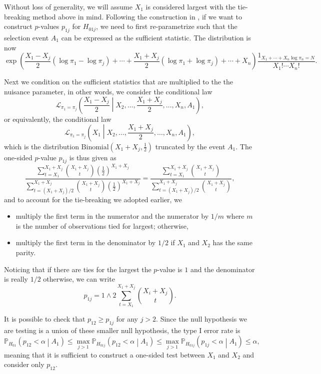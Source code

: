 \documentclass[11pt]{article}
\newcommand{\PP}{\mathbb{P}}
\begin{document}
Without loss of generality, we will assume $X_1$ is considered largest with the tie-breaking method above in mind. Following the construction in \cite{Fithian:2014ws}, if we want to construct $p$-values $p_{1j}$ for $H_{01j}$, we need to first re-parametrize such that the selection event $A_1$ can be expressed as the sufficient statistic. The distribution is now
$$\exp\left(\frac{X_1 - X_j}{2} \left(\log \pi_1 - \log \pi_j\right) + \cdots + \frac{X_1 + X_j}{2} \left(\log \pi_1 + \log \pi_j\right) + \cdots + X_n\right) \frac{1_{X_1 + \cdots + X_n \log \pi_n = N}}{X_1! \cdots X_n!}.$$

Next we condition on the sufficient statistics that are multiplied to the the nuisance parameter, in other words, we consider the conditional law
$$\mathcal{L}_{\pi_1 = \pi_j}\left(\frac{X_1 - X_j}{2} \middle| X_2, \ldots, \frac{X_1 + X_j}{2}, \ldots, X_n, A_1\right),$$
or equivalently, the conditional law
$$\mathcal{L}_{\pi_1 = \pi_j}\left(X_1 \middle| X_2, \ldots, \frac{X_1 + X_j}{2}, \ldots, X_n, A_1\right),$$
which is the distribution $\text{Binomial}\left(X_1 + X_j, \frac{1}{2}\right)$ truncated by the event $A_1$. The one-sided $p$-value $p_{1j}$ is thus given as
$$\frac{\sum_{t = X_1}^{X_1 + X_j} \binom{X_1 + X_j}{t} \left(\frac{1}{2}\right)^{X_1 + X_j}}{\sum_{t = \left(X_1 + X_j\right)/2}^{X_1 + X_j} \binom{X_1 + X_j}{t} \left(\frac{1}{2}\right)^{X_1 + X_j}} = \frac{\sum_{t = X_1}^{X_1 + X_j} \binom{X_1 + X_j}{t}}{\sum_{t = \left(X_1 + X_j\right)/2}^{X_1 + X_j} \binom{X_1 + X_j}{t}},$$
and to account for the tie-breaking we adopted earlier, we
\begin{itemize}
\item multiply the first term in the numerator and the numerator by $1/m$ where $m$ is the number of observations tied for largest; otherwise,
\item multiply the first term in the denominator by $1/2$ if $X_1$ and $X_2$ has the same parity.
\end{itemize}
Noticing that if there are ties for the largest the $p$-value is $1$ and the denominator is really $1/2$ otherwise, we can write
$$p_{1j} = 1 \wedge 2 \sum_{t=X_1}^{X_1 + X_j} \binom{X_i + X_j}{t}.$$

It is possible to check that $p_{12} \ge p_{1j}$ for any $j > 2$. Since the null hypothesis we are testing is a union of these smaller null hypothesis, the type I error rate is
$$\PP_{H_{01}}\left(p_{12} < \alpha \middle| A_1\right) \le \max_{j>1} \PP_{H_{01j}}\left(p_{12} < \alpha \middle| A_1\right) \le \max_{j>1} \PP_{H_{01j}}\left(p_{1j} < \alpha \middle| A_1\right) \le \alpha,$$
meaning that it is sufficient to construct a one-sided test between $X_1$ and $X_2$ and consider only $p_{12}$.
\end{document}

